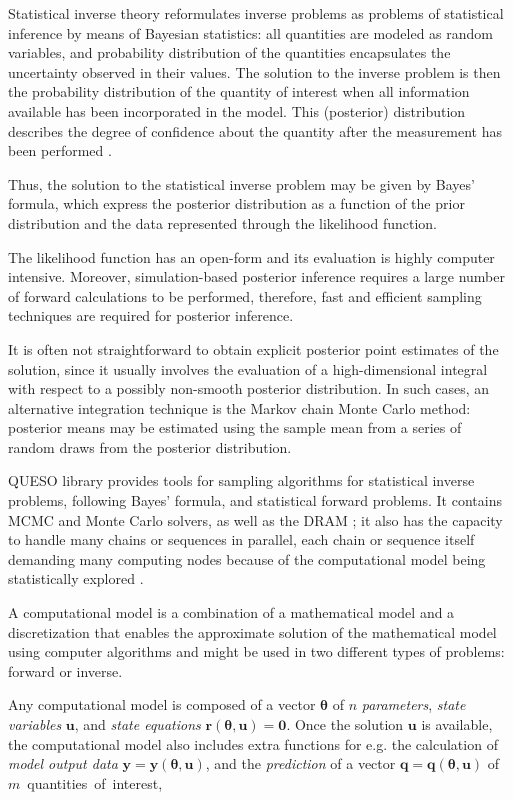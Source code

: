 Statistical inverse theory reformulates inverse problems as problems of statistical inference by means of Bayesian statistics: all quantities are modeled as random variables, and probability distribution of the quantities encapsulates the uncertainty observed in their values. The solution to the inverse problem is then the probability distribution of the quantity of interest when all information available has been incorporated in the model. This (posterior) distribution describes the degree of confidence about the quantity after the measurement has been performed \cite{KaSo05}.

Thus, the solution to the statistical inverse problem may be given by Bayes' formula, which express the posterior distribution as a function of the prior distribution and the data represented through the likelihood function.

The likelihood function has an open-form and its evaluation is highly computer intensive.  Moreover, simulation-based posterior inference requires a large number of forward calculations to be performed, therefore, fast and efficient sampling techniques are required for posterior inference.

It is often not straightforward to obtain explicit posterior point estimates of the solution, since it usually involves the evaluation of a high-dimensional integral with respect to a possibly non-smooth posterior distribution. In such cases, an alternative integration technique is the Markov chain Monte Carlo method: posterior means may be estimated using the sample mean from a series of random draws from the posterior distribution.

QUESO library provides tools for sampling algorithms for statistical inverse problems, following Bayes' formula, and statistical forward problems. It contains MCMC and Monte Carlo solvers, as well as the DRAM \cite{HaLaMiSa06}; it also has the capacity to handle many chains or sequences in parallel,
each chain or sequence itself demanding many computing nodes because of the computational model being statistically explored \cite{PrSc09}.


A computational model is a combination of a
mathematical model and a discretization that enables the approximate
solution of the mathematical model using computer algorithms and  might be used in two different types of problems:
forward or inverse. 

Any computational model is composed of a vector $\boldsymbol{\theta}$ of $n$ {\it parameters}, {\it state variables} $\mathbf{u}$, and {\it state equations} $\mathbf{r}(\boldsymbol{\theta},\mathbf{u}) = \mathbf{0}$.
Once the solution $\mathbf{u}$ is available, the computational model also includes extra functions for e.g.
the calculation of {\it model output data} $\mathbf{y} = \mathbf{y}(\boldsymbol{\theta},\mathbf{u})$, and the {\it prediction} of a
vector $\mathbf{q} = \mathbf{q}(\boldsymbol{\theta},\mathbf{u})$ of $m$~quantities~of~interest,

